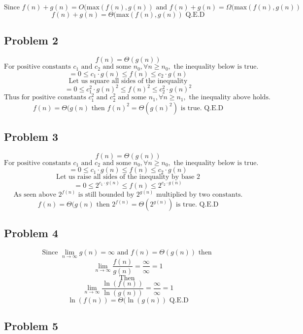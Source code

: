 \documentclass{article}
\begin{document}
$$\text{Since } f(n) + g(n) = O(\text{max}(f(n),g(n)) \text{ and } f(n) + g(n) = \Omega(\text{max}(f(n),g(n)) $$
$$f(n) + g(n) = \Theta(\text{max}(f(n),g(n)) \text{ Q.E.D}$$

\subsection{Problem 2}

$$f(n) = \Theta(g(n)) $$
$$\text{For positive constants } c_1 \text{ and } c_2 \text{ and some } n_0, \forall n \ge n_0, \text{ the inequality below is true.}$$
$$= 0 \le c_1 \cdot g(n) \le f(n) \le c_2 \cdot g(n) $$
$$\text{Let us square all sides of the inequality}$$
$$= 0 \le c_1^2 \cdot g(n)^2 \le f(n)^2 \le c_2^2 \cdot g(n)^2 $$
$$\text{Thus for positive constants } c_{1}^2 \text{ and } c_{2}^2 \text{ and some } n_1, \forall n \ge n_1,\text{ the inequality above holds.}$$
$$f(n) = \Theta(g(n) \text{ then } f(n)^2 = \Theta(g(n)^2) \text{ is true. Q.E.D} $$

\subsection{Problem 3}

$$f(n) = \Theta(g(n)) $$
$$\text{For positive constants } c_1 \text{ and } c_2 \text{ and some } n_0, \forall n \ge n_0, \text{ the inequality below is true.}$$
$$= 0 \le c_1 \cdot g(n) \le f(n) \le c_2 \cdot g(n) $$
$$\text{Let us raise all sides of the inequality by base 2}$$
$$= 0 \le 2^{c_1 \cdot g(n)} \le f(n) \le 2^{c_2 \cdot g(n)} $$
$$\text{As seen above } 2^{f(n)} \text{ is still bounded by } 2^{g(n)} \text{ multiplied by two constants.}$$
$$f(n) = \Theta(g(n) \text{ then } 2^{f(n)} = \Theta(2^{g(n)}) \text{ is true. Q.E.D} $$

\subsection{Problem 4}

$$\text{Since } \lim_{n \rightarrow \infty} g(n) = \infty \text{ and } f(n) = \Theta(g(n)) \text{ then } $$
$$\lim_{n \rightarrow \infty} \frac{f(n)}{g(n)} = \frac{\infty}{\infty} = 1$$
$$\text{Then }$$
$$\lim_{n \rightarrow \infty} \frac{\ln(f(n))}{\ln(g(n))} = \frac{\infty}{\infty} = 1$$
$$\ln(f(n)) = \Theta(\ln(g(n)) \text{ Q.E.D}$$

\subsection{Problem 5}
\end{document}
